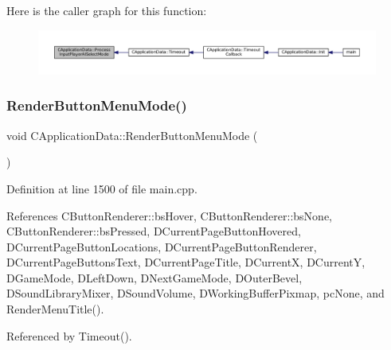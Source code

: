 Here is the caller graph for this function\+:\nopagebreak
\begin{figure}[H]
\begin{center}
\leavevmode
\includegraphics[width=350pt]{classCApplicationData_a096afda0b6459cfa73d66518ce23f68e_icgraph}
\end{center}
\end{figure}
\hypertarget{classCApplicationData_a4766e5533d32e4194816f5a4ea838bd3}{}\label{classCApplicationData_a4766e5533d32e4194816f5a4ea838bd3} 
\subsubsection{\texorpdfstring{Render\+Button\+Menu\+Mode()}{RenderButtonMenuMode()}}
{\footnotesize\ttfamily void C\+Application\+Data\+::\+Render\+Button\+Menu\+Mode (\begin{DoxyParamCaption}{ }\end{DoxyParamCaption})\hspace{0.3cm}{\ttfamily [protected]}}



Definition at line 1500 of file main.\+cpp.



References C\+Button\+Renderer\+::bs\+Hover, C\+Button\+Renderer\+::bs\+None, C\+Button\+Renderer\+::bs\+Pressed, D\+Current\+Page\+Button\+Hovered, D\+Current\+Page\+Button\+Locations, D\+Current\+Page\+Button\+Renderer, D\+Current\+Page\+Buttons\+Text, D\+Current\+Page\+Title, D\+CurrentX, D\+CurrentY, D\+Game\+Mode, D\+Left\+Down, D\+Next\+Game\+Mode, D\+Outer\+Bevel, D\+Sound\+Library\+Mixer, D\+Sound\+Volume, D\+Working\+Buffer\+Pixmap, pc\+None, and Render\+Menu\+Title().



Referenced by Timeout().



